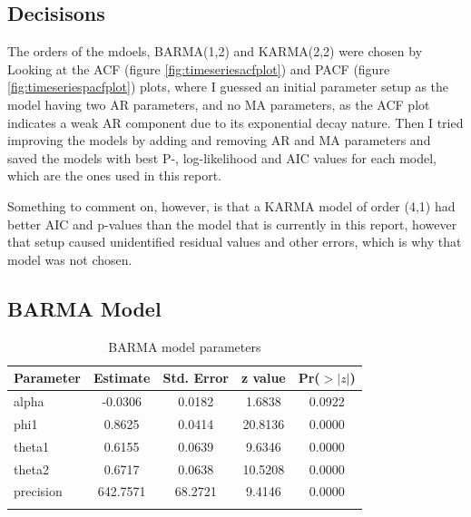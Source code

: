\documentclass[12pt,a4paper,twoside]{article}
\begin{document}
\subsection{Decisisons}
The orders of the mdoels, BARMA(1,2) and KARMA(2,2) were chosen by Looking at the ACF (figure \ref{fig:timeseriesacfplot}) and PACF (figure \ref{fig:timeseriespacfplot})
plots, where I guessed an initial parameter setup as the model having two AR parameters, and no MA parameters, as the ACF plot indicates a weak AR component due to its
exponential decay nature. Then I tried improving the models by adding and removing AR and MA parameters and saved the models with best P-, log-likelihood and AIC values
for each model, which are the ones used in this report.

Something to comment on, however, is that a KARMA model of order (4,1) had better AIC and p-values than the model that is currently in this report, however that setup 
caused unidentified residual values and other errors, which is why that model was not chosen. 

\newpage

\subsection{BARMA Model}
\label{ssec:BARMA}
\begin{longtable}{lcccc}
    \caption{BARMA model parameters}\\
    \hline
    \textbf{Parameter} & \textbf{Estimate} & \textbf{Std. Error} & \textbf{z value} & \textbf{Pr($>|z|$)} \\
    \hline
    alpha              & -0.0306           & 0.0182              & 1.6838           & 0.0922              \\
    phi1               & 0.8625            & 0.0414              & 20.8136          & 0.0000              \\
    theta1             & 0.6155            & 0.0639              & 9.6346           & 0.0000              \\
    theta2             & 0.6717            & 0.0638              & 10.5208          & 0.0000              \\
    precision          & 642.7571          & 68.2721             & 9.4146           & 0.0000              \\
    \hline
    \label{tab:BARMAparamstab}
\end{longtable}
\end{document}
